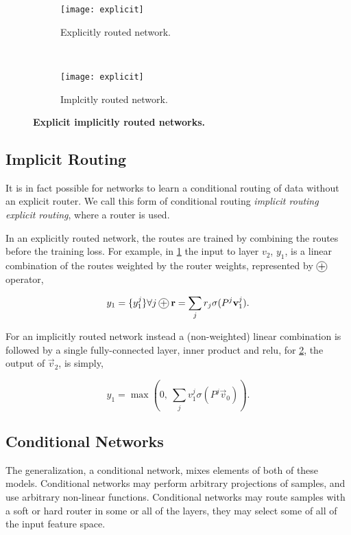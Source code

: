 \documentclass[thesis]{subfiles}
\begin{document}
	
	\begin{figure}[tbp] 
		\centering
		\begin{subfigure}[b]{0.45\textwidth}
			\centering
			\texttt{[image: explicit]}
			\caption{Explicitly routed network.}\label{fig:explicitRouter}
		\end{subfigure}
		~
		\begin{subfigure}[b]{0.45\textwidth}
			\centering
			\texttt{[image: explicit]}
			\caption{Implcitly routed network.}\label{fig:implicitRouter}
		\end{subfigure}
		\caption[Explicit \vs{}implicitly routed networks.]{\textbf{Explicit \vs{}implicitly routed networks.}}\label{fig:routerConnections}
	\end{figure}
	
	\subsection{Implicit Routing}
	It is in fact possible for networks to learn a conditional routing of data without an explicit router. We call this form of conditional routing \emph{implicit routing} \vs \emph{explicit routing}, where a router is used. 
	
	In an explicitly routed network, the routes are trained by combining the routes before the training loss. For example, in \cref{fig:explicitRouter} the input to layer $v_2$, $y_1$, is a linear combination of the routes weighted by the router weights, represented by $\circleplus$ operator,
	
	\begin{equation}
	y_1 = \{y_1^j\} \forall j\circleplus \vec r = \sum_j r_j \sigma(P^j \vec v_1^j ).
	\end{equation}
	
	For an implicitly routed network instead a (non-weighted) linear combination is followed by a single fully-connected layer, \ie inner product and \gls{relu}, \ie for \cref{fig:implicitRouter}, the output of $\vec v_2$,  is simply,
	
	\begin{equation}
	y_1 = \max (0, ~\sum_j v_1^j \sigma(P^j \vec v_0) ).
	\end{equation}
	
	\subsection{Conditional Networks}
	The generalization, a conditional network, mixes elements of both of these models. Conditional networks may perform arbitrary projections of samples, and use arbitrary non-linear functions. Conditional networks may route samples with a soft or hard router in some or all of the layers, they may select some of all of the input feature space. 
	
\end{document}

